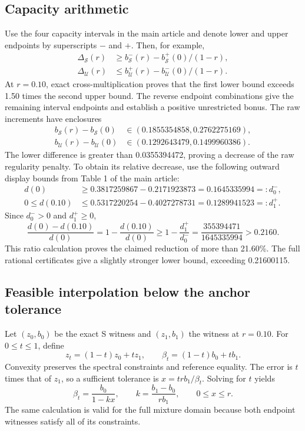 \documentclass[9pt]{osa-supplemental-document}
\begin{document}
\subsection{Capacity arithmetic}
Use the four capacity intervals in the main article and denote lower and upper endpoints by superscripts $-$ and $+$. Then, for example,
\begin{align}
 \Delta_{\mathcal S}(r)&\geq b_{\mathcal S}^-(r)-b_{\mathcal S}^+(0)/(1-r),\\
 \Delta_{\mathcal U}(r)&\leq b_{\mathcal U}^+(r)-b_{\mathcal U}^-(0)/(1-r).
\end{align}
At $r=0.10$, exact cross-multiplication proves that the first lower bound exceeds 1.50 times the second upper bound. The reverse endpoint combinations give the remaining interval endpoints and establish a positive unrestricted bonus. The raw increments have enclosures
\begin{align}
 b_{\mathcal S}(r)-b_{\mathcal S}(0)&\in(0.1855354858,0.2762275169),\\
 b_{\mathcal U}(r)-b_{\mathcal U}(0)&\in(0.1292643479,0.1499960386).
\end{align}
The lower difference is greater than 0.0355394472, proving a decrease of the raw regularity penalty. To obtain its relative decrease, use the following outward display bounds from Table 1 of the main article:
\begin{align}
 d(0)&\geq0.3817259867-0.2171923873
       =0.1645335994=:d_0^-,\\
 0\leq d(0.10)&\leq0.5317220254-0.4027278731
       =0.1289941523=:d_1^+.
\end{align}
Since $d_0^->0$ and $d_1^+\geq0$,
\begin{equation}
 \frac{d(0)-d(0.10)}{d(0)}
 =1-\frac{d(0.10)}{d(0)}
 \geq1-\frac{d_1^+}{d_0^-}
 =\frac{355394471}{1645335994}>0.2160.
 \label{eq:penaltyfraction}
\end{equation}
This ratio calculation proves the claimed reduction of more than 21.60\%. The full rational certificates give a slightly stronger lower bound, exceeding 0.21600115.

\subsection{Feasible interpolation below the anchor tolerance}
Let $(z_0,b_0)$ be the exact S witness and $(z_1,b_1)$ the witness at $r=0.10$. For $0\leq t\leq1$, define
\begin{equation}
 z_t=(1-t)z_0+tz_1,\qquad\beta_t=(1-t)b_0+tb_1.
\end{equation}
Convexity preserves the spectral constraints and reference equality. The error is $t$ times that of $z_1$, so a sufficient tolerance is $x=trb_1/\beta_t$. Solving for $t$ yields
\begin{equation}
 \beta_t=\frac{b_0}{1-kx},\qquad
 k=\frac{b_1-b_0}{rb_1},\qquad0\leq x\leq r.
 \label{eq:blendexact}
\end{equation}
The same calculation is valid for the full mixture domain because both endpoint witnesses satisfy all of its constraints.
\end{document}
